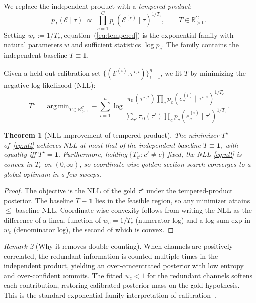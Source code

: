 \documentclass[11pt,a4paper]{article}
\newcommand{\R}{\mathbb{R}}
\newcommand{\Ecal}{\mathcal{E}}
\DeclareMathOperator*{\argmin}{arg\,min}
\theoremstyle{plain}
\newtheorem{theorem}{Theorem}
\theoremstyle{definition}
\theoremstyle{remark}
\newtheorem{remark}[theorem]{Remark}
\begin{document}
We replace the independent product with a \emph{tempered product}:
\begin{equation}
\label{eq:tempered}
p_T(\Ecal \mid \tau) \;\propto\; \prod_{c=1}^{C}
  p_c(\Ecal^{(c)} \mid \tau)^{1/T_c}, \qquad T \in \R_{>0}^C.
\end{equation}
Setting $w_c := 1/T_c$, equation~(\ref{eq:tempered}) is the
exponential family with natural parameters $w$ and sufficient
statistics $\log p_c$. The family contains the independent baseline
$T \equiv \mathbf{1}$.

Given a held-out calibration set
$\{(\Ecal^{(i)}, \tau^{\star,i})\}_{i=1}^n$, we fit $T$ by minimizing
the negative log-likelihood (NLL):
\begin{equation}
\label{eq:nll}
T^\star = \argmin_{T \in \R_{>0}^C}
  -\sum_{i=1}^{n}
    \log \frac{\pi_0(\tau^{\star,i}) \prod_c p_c(e^{(i)}_c \mid \tau^{\star,i})^{1/T_c}}
              {\sum_{\tau'} \pi_0(\tau') \prod_c p_c(e^{(i)}_c \mid \tau')^{1/T_c}}.
\end{equation}

\begin{theorem}[NLL improvement of tempered product]
\label{thm:tempered}
The minimizer $T^\star$ of~\eqref{eq:nll} achieves NLL at most that of
the independent baseline $T \equiv \mathbf{1}$, with equality iff
$T^\star = \mathbf{1}$. Furthermore, holding $\{T_{c'} : c' \ne c\}$
fixed, the NLL \eqref{eq:nll} is convex in $T_c$ on $(0,\infty)$, so
coordinate-wise golden-section search converges to a global optimum
in a few sweeps.
\end{theorem}

\begin{proof}
The objective is the NLL of the gold $\tau^\star$ under the
tempered-product posterior. The baseline $T \equiv \mathbf{1}$ lies
in the feasible region, so any minimizer attains $\leq$ baseline NLL.
Coordinate-wise convexity follows from writing the NLL as the
difference of a linear function of $w_c{=}1/T_c$ (numerator log) and
a log-sum-exp in $w_c$ (denominator log), the second of which is
convex.
\end{proof}

\begin{remark}[Why it removes double-counting]
\label{rem:double-counting}
When channels are positively correlated, the redundant information is
counted multiple times in the independent product, yielding an
over-concentrated posterior with low entropy and over-confident
commits. The fitted $w_c < 1$ for the redundant channels softens
each contribution, restoring calibrated posterior mass on the gold
hypothesis. This is the standard exponential-family interpretation
of calibration~\citep[Sec.~3.4]{wainwright2008graphical}.
\end{remark}
\end{document}
